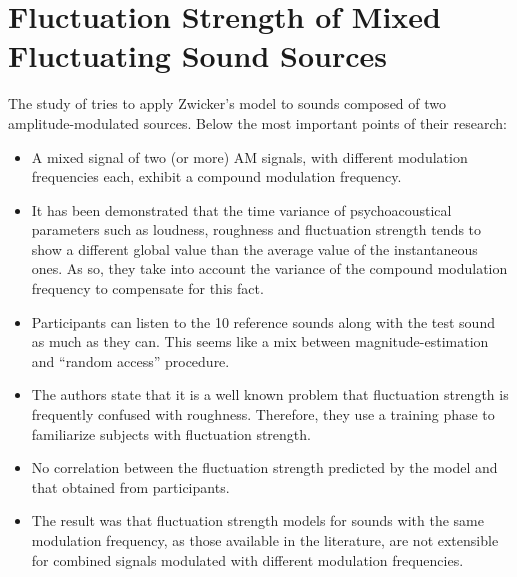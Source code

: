 \section{Fluctuation Strength of Mixed Fluctuating Sound Sources}

The study of \citeauthor{Accolti2009Fluctuation} tries to apply Zwicker's model
to sounds composed of two amplitude-modulated sources. Below the most important
points of their research:

\begin{itemize}
    \item A mixed signal of two (or more) AM signals, with different modulation
        frequencies each, exhibit a compound modulation frequency.
    \item It has been demonstrated that the time variance of psychoacoustical
        parameters such as loudness, roughness and fluctuation strength tends to
        show a different global value than the average value of the
        instantaneous ones. As so, they take into account the variance of the
        compound modulation frequency to compensate for this fact.
    \item Participants can listen to the 10 reference sounds along with the
        test sound as much as they can. This seems like a mix between
        magnitude-estimation and ``random access'' procedure.
    \item The authors state that it is a well known problem that fluctuation
        strength is frequently confused with roughness. Therefore, they use a
        training phase to familiarize subjects with fluctuation strength.
    \item No correlation between the fluctuation strength predicted by the model
        and that obtained from participants.
    \item  The result was that fluctuation strength models for sounds with the
        same modulation frequency, as those available in the literature, are not
        extensible for combined signals modulated with different modulation
        frequencies.
\end{itemize}
